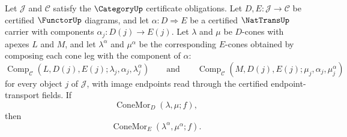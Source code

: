 \begin{theorem}
\label{thm:catlimit-cone-morphism-nattrans-whiskering-descent}
Let $\mathcal J$ and $\mathcal C$ satisfy the $\CategoryUp$ certificate obligations. Let $D,E:\mathcal J\to\mathcal C$ be certified $\FunctorUp$ diagrams, and let $\alpha:D\Rightarrow E$ be a certified $\NatTransUp$ carrier with components $\alpha_j:D(j)\to E(j)$. Let $\lambda$ and $\mu$ be $D$-cones with apexes $L$ and $M$, and let $\lambda^\alpha$ and $\mu^\alpha$ be the corresponding $E$-cones obtained by composing each cone leg with the component of $\alpha$:
$$
\operatorname{Comp}_{\mathcal C}(L,D(j),E(j);\lambda_j,\alpha_j,\lambda^\alpha_j)
\qquad\text{and}\qquad
\operatorname{Comp}_{\mathcal C}(M,D(j),E(j);\mu_j,\alpha_j,\mu^\alpha_j)
$$
for every object $j$ of $\mathcal J$, with image endpoints read through the certified endpoint-transport fields. If
$$
\operatorname{ConeMor}_{D}(\lambda,\mu;f),
$$
then
$$
\operatorname{ConeMor}_{E}(\lambda^\alpha,\mu^\alpha;f).
$$
\end{theorem}
